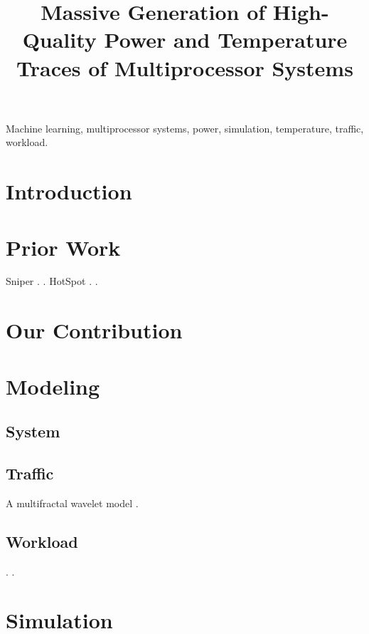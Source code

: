 \documentclass[conference]{IEEEtran}
\title{
  Massive Generation of High-Quality Power and Temperature Traces of
  Multiprocessor Systems
}
\author{}
\begin{document}
  \maketitle

  \begin{abstract}
    
  \end{abstract}

  \begin{IEEEkeywords}
    Machine learning,
    multiprocessor systems,
    power,
    simulation,
    temperature,
    traffic,
    workload.
  \end{IEEEkeywords}


  \section{Introduction} 
  

  \section{Prior Work}
  Sniper \cite{carlson2011}.
   \cite{li2009}.
  HotSpot \cite{skadron2004}.
   \cite{sridhar2010}.

  \section{Our Contribution}

  \section{Modeling}
  \subsection{System}

  \subsection{Traffic}
  A multifractal wavelet model \cite{riedi1999}.

  \subsection{Workload}
   \cite{bienia2011}.
   \cite{cpu2006}.

  \section{Simulation}
\end{document}
